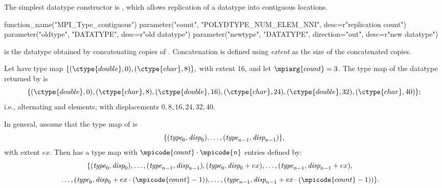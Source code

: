 The simplest datatype constructor is
, which
allows replication of a datatype into contiguous locations.

%
\begin{mpi-binding}
    function_name("MPI_Type_contiguous")
    parameter("count", "POLYDTYPE_NUM_ELEM_NNI", desc=r"replication count")
    parameter("oldtype", "DATATYPE", desc=r"old datatype")
    parameter("newtype", "DATATYPE", direction="out", desc=r"new datatype")
\end{mpi-binding}


\noindent
{} is the datatype obtained by concatenating
 copies of
.
Concatenation is defined using \emph{extent} as the size of
the concatenated copies.


\begin{example}
\label{pt2pt-exS}
%
%
Let  have type map
\(
\{ (\ctype{double}, 0), (\ctype{char}, 8) \} ,
\)
with extent 16,
and let $\mpiarg{count} = 3$.  The type map of
the datatype returned by  is
\begin{displaymath}
\{ (\ctype{double}, 0), (\ctype{char}, 8), (\ctype{double}, 16),
   (\ctype{char}, 24), (\ctype{double}, 32), (\ctype{char}, 40) \};
\end{displaymath}
i.e., alternating  and  elements, with displacements
$0, 8, 16, 24, 32, 40$.
\end{example}

In general,
assume that the type map of  is
\begin{displaymath}
\{ (\textrm{\itshape{type}}_0,\textrm{\itshape{disp}}_0), \ldots , (\textrm{\itshape{type}}_{n-1}, \textrm{\itshape{disp}}_{n-1}) \} ,
\end{displaymath}
with extent $ex$.
Then  has a type map with $\mpicode{count} \cdot \mpicode{n}$
entries defined by:
\begin{displaymath}
\hskip-1em\{ (\mword{type}_0, \mword{disp}_0), \ldots , (\mword{type}_{n-1}, \mword{disp}_{n-1}), %
(\mword{type}_0, \mword{disp}_0 +ex), \ldots ,(\mword{type}_{n-1}, \mword{disp}_{n-1} + ex),\\
\end{displaymath}
\begin{displaymath}
\hskip-1em\ldots,(\mword{type}_0, \mword{disp}_0 +ex \cdot(\mpicode{count}-1) ), \ldots ,%
(\mword{type}_{n-1} , \mword{disp}_{n-1} + ex \cdot (\mpicode{count}-1)) \} .
\end{displaymath}

